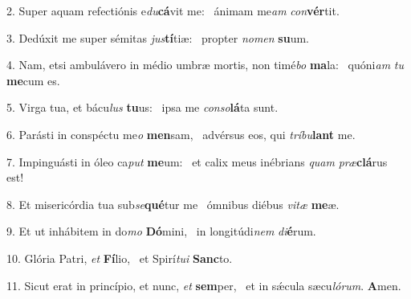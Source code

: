 2. Super aquam refectiónis e\textit{du}\textbf{cá}vit me: \ast\  ánimam me\textit{am} \textit{con}\textbf{vér}tit.\

3. Dedúxit me super sémitas \textit{jus}\textbf{tí}tiæ: \ast\  propter \textit{no}\textit{men} \textbf{su}um.\

4. Nam, etsi ambulávero in médio umbræ mortis, non timé\textit{bo} \textbf{ma}la: \ast\  quóni\textit{am} \textit{tu} \textbf{me}cum es.\

5. Virga tua, et bácu\textit{lus} \textbf{tu}us: \ast\  ipsa me \textit{con}\textit{so}\textbf{lá}ta sunt.\

6. Parásti in conspéctu me\textit{o} \textbf{men}sam, \ast\  advérsus eos, qui \textit{trí}\textit{bu}\textbf{lant} me.\

7. Impinguásti in óleo ca\textit{put} \textbf{me}um: \ast\  et calix meus inébrians \textit{quam} \textit{præ}\textbf{clá}rus est!\

8. Et misericórdia tua sub\textit{se}\textbf{qué}tur me \ast\  ómnibus diébus \textit{vi}\textit{tæ} \textbf{me}æ.\

9. Et ut inhábitem in do\textit{mo} \textbf{Dó}mini, \ast\  in longitúdi\textit{nem} \textit{di}\textbf{é}rum.\

10. Glória Patri, \textit{et} \textbf{Fí}lio, \ast\  et Spirí\textit{tu}\textit{i} \textbf{Sanc}to.\

11. Sicut erat in princípio, et nunc, \textit{et} \textbf{sem}per, \ast\  et in sǽcula sæcu\textit{ló}\textit{rum}. \textbf{A}men.\

